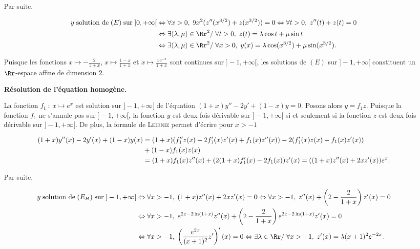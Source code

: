 {\begin{enumerate}
{Par suite,

\begin{align*}\ensuremath
y\;\text{solution de}\;(E)\;\text{sur}\;]0,+\infty[&\Leftrightarrow\forall x>0,\;9x^2(z''(x^{3/2})+z(x^{3/2}))=0\Leftrightarrow\forall t>0,\;z''(t)+z(t)=0\\
 &\Leftrightarrow\exists(\lambda,\mu)\in\Rr^2/\;\forall t>0,\;z(t)=\lambda\cos t+\mu\sin t\\
 &\Leftrightarrow\exists(\lambda,\mu)\in\Rr^2/\;\forall x>0,\;y(x)=\lambda\cos(x^{3/2})+\mu\sin(x^{3/2}).
\end{align*}

\begin{center}
\shadowbox{
$\mathcal{S}_{]0,+\infty[}=\left\{x\mapsto\lambda\cos(x^{3/2})+\mu\sin(x^{3/2}),\;(\lambda,\mu)\in\Rr^2\right\}$.
}
\end{center}
Puisque les fonctions $x\mapsto- \frac{2}{1+x}$, $x\mapsto \frac{1-x}{1+x}$ et $x\mapsto \frac{xe^{-x}}{1+x}$ sont continues sur $]-1,+\infty[$, les solutions de $(E)$ sur $]-1,+\infty[$ constituent un $\Rr$-espace affine de dimension $2$.

\textbf{Résolution de l'équation homogène.} 

La fonction $f_1~:~x\mapsto e^x$ est solution sur $]-1,+\infty[$ de l'équation $(1+x)y''-2y'+(1-x)y=0$. Posons alors $y=f_1z$. Puisque la fonction $f_1$ ne s'annule pas sur $]-1,+\infty[$, la fonction $y$ est deux fois dérivable sur $]-1,+\infty[$ si et seulement si la fonction $z$ est deux fois dérivable sur $]-1,+\infty[$. De plus, la formule de \textsc{Leibniz} permet d'écrire pour $x>-1$

\begin{align*}\ensuremath
(1+x)y''(x)-2y'(x)+(1-x)y(x)&=(1+x)(f_1''z(x)+2f_1'(x)z'(x)+f_1(x)z''(x))-2(f_1'(x)z(x)+f_1(x)z'(x))\\
 &+(1-x)f_1(x)z(x)\\
 &=(1+x)f_1(x)z''(x)+(2(1+x)f_1'(x)-2f_1(x))z'(x)=((1+x)z''(x)+2xz'(x))e^x.
\end{align*}

Par suite,

\begin{align*}\ensuremath
y\;\text{solution de}\;(E_H)\;\text{sur}\;]-1,+\infty[&\Leftrightarrow\forall x>-1,\;(1+x)z''(x)+2xz'(x)=0\Leftrightarrow\forall x>-1,\;z''(x)+\left(2- \frac{2}{1+x}\right)z'(x)=0\\
 &\Leftrightarrow\forall x>-1,\;e^{2x-2\ln(1+x)}z''(x)+\left(2- \frac{2}{1+x}\right)e^{2x-2\ln(1+x)}z'(x)=0\\
 &\Leftrightarrow\forall x>-1,\;\left( \frac{e^{2x}}{(x+1)^2}z'\right)'(x)=0\Leftrightarrow\exists\lambda\in\Rr/\;\forall x>-1,\;z'(x)=\lambda(x+1)^2e^{-2x}.
\end{align*}

}
\end{enumerate}}

